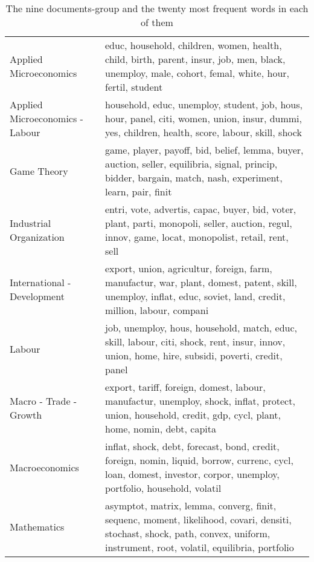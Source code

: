 \begin{table}[tb]
\centering
\caption[Groups]{The nine documents-group and the twenty most frequent words in each of them}
\label{tab:groups}
\begin{tabularx}{\hsize}{lY}
\toprule
         Applied Microeconomics &                             educ, household, children, women, health, child, birth, parent, insur, job, men, black, unemploy, male, cohort, femal, white, hour, fertil, student \\
Applied Microeconomics - Labour &                                household, educ, unemploy, student, job, hous, hour, panel, citi, women, union, insur, dummi, yes, children, health, score, labour, skill, shock \\
                    Game Theory &                     game, player, payoff, bid, belief, lemma, buyer, auction, seller, equilibria, signal, princip, bidder, bargain, match, nash, experiment, learn, pair, finit \\
        Industrial Organization &                             entri, vote, advertis, capac, buyer, bid, voter, plant, parti, monopoli, seller, auction, regul, innov, game, locat, monopolist, retail, rent, sell \\
    International - Development &                 export, union, agricultur, foreign, farm, manufactur, war, plant, domest, patent, skill, unemploy, inflat, educ, soviet, land, credit, million, labour, compani \\
                         Labour &                                 job, unemploy, hous, household, match, educ, skill, labour, citi, shock, rent, insur, innov, union, home, hire, subsidi, poverti, credit, panel \\
         Macro - Trade - Growth &                    export, tariff, foreign, domest, labour, manufactur, unemploy, shock, inflat, protect, union, household, credit, gdp, cycl, plant, home, nomin, debt, capita \\
                 Macroeconomics &             inflat, shock, debt, forecast, bond, credit, foreign, nomin, liquid, borrow, currenc, cycl, loan, domest, investor, corpor, unemploy, portfolio, household, volatil \\
                    Mathematics & asymptot, matrix, lemma, converg, finit, sequenc, moment, likelihood, covari, densiti, stochast, shock, path, convex, uniform, instrument, root, volatil, equilibria, portfolio \\
\bottomrule
\end{tabularx}
\end{table}
